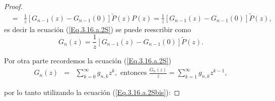 \documentclass{article}
\begin{document}
\begin{proof}
\begin{eqnarray*}
&=&\frac{1}{z}\left[G_{n-1}\left(z\right)-G_{n-1}\left(0\right)\right]\check{P}\left(z\right)P\left(z\right)=\frac{1}{z}\left[G_{n-1}\left(z\right)-G_{n-1}\left(0\right)\right]\tilde{P}\left(z\right),
\end{eqnarray*}
es decir la ecuaci\'on (\ref{Eq.3.16.a.2S}) se puede reescribir como
\begin{equation}\label{Eq.3.16.a.2Sbis}
G_{n}\left(z\right)=\frac{1}{z}\left[G_{n-1}\left(z\right)-G_{n-1}\left(0\right)\right]\tilde{P}\left(z\right).
\end{equation}

Por otra parte recordemos la ecuaci\'on (\ref{Eq.3.16.a.2S})
\begin{eqnarray*}
G_{n}\left(z\right)&=&\sum_{k=0}^{\infty}g_{n,k}z^{k},\textrm{ entonces }\frac{G_{n}\left(z\right)}{z}=\sum_{k=1}^{\infty}g_{n,k}z^{k-1},
\end{eqnarray*}

por lo tanto utilizando la ecuaci\'on (\ref{Eq.3.16.a.2Sbis}):


\end{proof}
\end{document}

